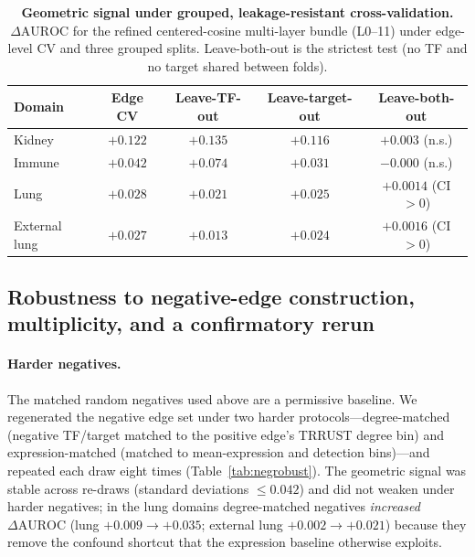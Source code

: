 \documentclass[11pt]{article}
\newcommand{\DAURC}{\Delta\mathrm{AUROC}}
\begin{document}
\begin{table}[t]
\centering
\caption{\textbf{Geometric signal under grouped, leakage-resistant cross-validation.}
$\DAURC$ for the refined centered-cosine multi-layer bundle (L0--11) under edge-level CV and three grouped splits.
Leave-both-out is the strictest test (no TF and no target shared between folds).}
\label{tab:grouped}
\small
\begin{tabular}{lcccc}
\toprule
\textbf{Domain} & \textbf{Edge CV} & \textbf{Leave-TF-out} & \textbf{Leave-target-out} & \textbf{Leave-both-out} \\
\midrule
Kidney        & $+0.122$ & $+0.135$ & $+0.116$ & $+0.003$ (n.s.) \\
Immune        & $+0.042$ & $+0.074$ & $+0.031$ & $-0.000$ (n.s.) \\
Lung          & $+0.028$ & $+0.021$ & $+0.025$ & $+0.0014$ (CI${}>0$) \\
External lung & $+0.027$ & $+0.013$ & $+0.024$ & $+0.0016$ (CI${}>0$) \\
\bottomrule
\end{tabular}
\end{table}

\subsection*{Robustness to negative-edge construction, multiplicity, and a confirmatory rerun}

\paragraph{Harder negatives.}
The matched random negatives used above are a permissive baseline.
We regenerated the negative edge set under two harder protocols---degree-matched (negative TF/target matched to the positive edge's TRRUST degree bin) and expression-matched (matched to mean-expression and detection bins)---and repeated each draw eight times (Table~\ref{tab:negrobust}).
The geometric signal was stable across re-draws (standard deviations $\le 0.042$) and did not weaken under harder negatives; in the lung domains degree-matched negatives \emph{increased} $\DAURC$ (lung $+0.009 \to +0.035$; external lung $+0.002 \to +0.021$) because they remove the confound shortcut that the expression baseline otherwise exploits.
\end{document}

